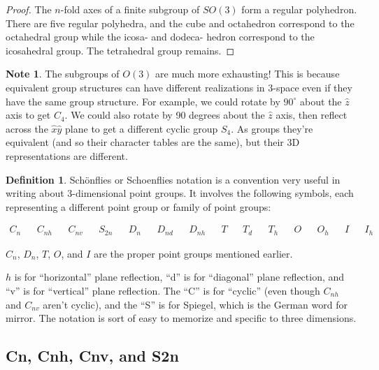 \documentclass[12pt, letterpaper]{article}
\theoremstyle{definition} %
\newtheorem{defn}[thm]{Definition} %
\newtheorem{note}[thm]{Note}
\begin{document}
\begin{proof}
  The $n$-fold axes of a finite subgroup of $SO(3)$ form a regular polyhedron. There are five regular polyhedra, and
  the cube and octahedron correspond to the octahedral group while the icosa- and dodeca- hedron correspond to 
  the icosahedral group. The tetrahedral group remains.
\end{proof}

\begin{note}
  The subgroups of $O(3)$ are much more exhausting! This is because equivalent group structures can have 
  different realizations in 3-space even if they have the same group structure. For example, we could rotate by
  $90^\circ$ about the $\hat{z}$ axis to get $C_4$. We could also rotate by 90 degrees about the $\hat{z}$ axis,
  then reflect across the $\hat{x}\hat{y}$ plane to get a different cyclic group $S_{4}$. As groups they're equivalent (and so
  their character tables are the same),
  but their 3D representations are different.
\end{note}

\begin{defn}
  Sch\"onflies or Schoenflies notation is a convention very useful in writing about
  3-dimensional point groups. It involves the following symbols, each representing 
  a different point group or family of point groups:

  \begin{align*}
 C_n &&  C_{nh} && C_{nv} && S_{2n} &&D_n && D_{nd} && D_{nh} && T && T_d && T_h && O && O_h && I && I_h
  \end{align*}

  $C_n$, $D_n$, $T$, $O$, and $I$ are the proper point groups mentioned earlier.

  $h$ is for ``horizontal'' plane reflection, ``d'' is for ``diagonal'' plane reflection, and ``v'' is for ``vertical'' plane
  reflection. The ``C'' is for ``cyclic'' (even though $C_{nh}$ and $C_{nv}$ aren't cyclic), and the ``S'' is for Spiegel, 
  which is the German word for mirror. The notation is sort of easy to memorize and specific to three dimensions.
\end{defn}

\subsection{Cn, Cnh, Cnv, and S2n}
\end{document}
